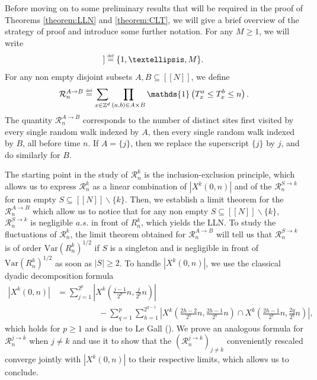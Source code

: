 \documentclass[10pt,a4paper]{amsart}
\newcommand{\R}{\mathcal R}
\newcommand{\1}{\mathds{1}}
\newcommand{\ZZ}{\mathbb Z}
\newcommand{\Var}{\mathrm{Var}}
\newcommand{\eqdef}{\stackrel{\scaleto{\mathrm{def}}{3.5pt}}{=}}
\numberwithin{equation}{section}
\begin{document}
Before moving on to some preliminary results that will be required in the proof of Theorems \ref{theorem:LLN} and \ref{theorem:CLT}, we will give a brief overview of the strategy of proof and introduce some further notation. For any $M\ge1$, we will write
\begin{equation*}
    [\![M]\!]\eqdef\{1,\dots,M\}.
\end{equation*}
For any non empty disjoint subsets $A,B\subseteq[\![N]\!]$, we define
\begin{equation*}
    \R_n^{A\rightarrow B}\eqdef\sum_{x\in\ZZ^d}\prod_{(a,b)\in A\times B}\1\left(T_x^a\le T_x^b\le n\right).
\end{equation*}
The quantity $\mathcal R_n^{A\rightarrow B}$ corresponds to the number of distinct sites first visited by every single random walk indexed by $A$, then every single random walk indexed by $B$, all before time $n$. If $A=\{j\}$, then we replace the superscript $\{j\}$ by $j$, and do similarly for $B$.

The starting point in the study of $\R_n^k$ is the inclusion-exclusion principle, which allows us to express $\R_n^k$ as a linear combination of $\left|X^k(0,n)\right|$ and of the $\R_n^{S\rightarrow k}$ for non empty $S\subseteq[\![N]\!]\backslash\{k\}$. Then, we establish a limit theorem for the $\R_n^{A\rightarrow B}$ which allow us to notice that for any non empty $S\subseteq[\![N]\!]\backslash\{k\}$, $\R_n^{S\rightarrow k}$ is negligible $a.s.$ in front of $R_n^k$, which yields the LLN. To study the fluctuations of $\R_n^k$, the limit theorem obtained for $\R_n^{A\rightarrow B}$ will tell us that $\R_n^{S\rightarrow k}$ is of order $\Var(R_n^k)^{1/2}$ if $S$ is a singleton and is negligible in front of $\Var(R_n^k)^{1/2}$ as soon as $|S|\ge2$. To handle $\left|X^k(0,n)\right|$, we use the classical dyadic decomposition formula
\begin{align}
    \label{eq:decomposition for the classic range}
    \left|X^k(0,n)\right|&=\sum_{j=1}^{2^p}\left|X^k\left(\frac{j-1}{2^p}n,\frac{j}{2^p}n\right)\right|\\
    &\hspace{5em}-\sum_{q=1}^p\sum_{h=1}^{2^{q-1}}\left|X^k\left(\frac{2h-2}{2^{q}}n,\frac{2h-1}{2^q}n\right)\cap X^k\left(\frac{2h-1}{2^q}n,\frac{2q}{2^q}n\right)\right|,\nonumber
\end{align}
which holds for $p\ge1$ and is due to Le Gall (\cite{LeGallIntersectionsMarchesAléatoires1986}). We prove an analogous formula for $\R_n^{j\rightarrow k}$ when $j\ne k$ and use it to show that the $\left(\R_n^{j\rightarrow k}\right)_{j\ne k}$ conveniently rescaled converge jointly with $\left|X^k(0,n)\right|$ to their respective limits, which allows us to conclude.
\end{document}
